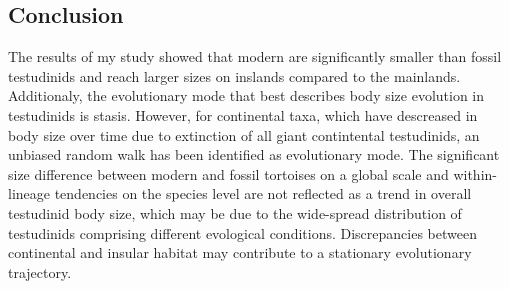 




\subsection{Conclusion}
The results of my study showed that modern \T are significantly smaller than fossil testudinids and reach larger sizes on inslands compared to the mainlands.
Additionaly, the evolutionary mode that best describes body size evolution in testudinids is stasis.
However, for continental taxa, which have descreased in body size over time due to extinction of all giant contintental testudinids, an unbiased random walk has been identified as evolutionary mode.
The significant size difference between modern and fossil tortoises on a global scale and within-lineage tendencies on the species level are not reflected as a trend in overall testudinid body size, which may be due to the wide-spread distribution of testudinids comprising different evological conditions.
Discrepancies between continental and insular habitat may contribute to a stationary evolutionary trajectory.

